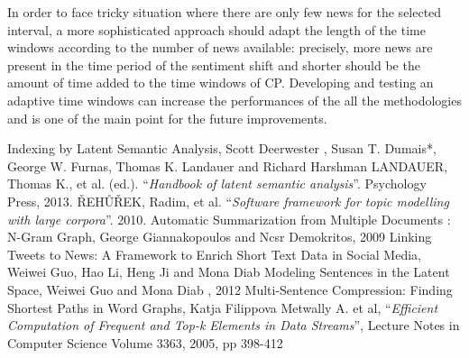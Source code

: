 \documentclass{acm_proc_article-sp-sigmod07}
\begin{document}
In order to face tricky situation where there are only few news for the selected interval, a more sophisticated approach should adapt the length of the time windows according to the number of news available:
precisely, more news are present in the time period of the sentiment shift and shorter should be the amount of time added to the time windows of CP.
Developing and testing an adaptive time windows can increase the performances of the all the methodologies and is one of the main point for the future improvements.

\begin{thebibliography}{9}
	Indexing by Latent Semantic Analysis, Scott Deerwester , Susan T. Dumais*, George W. Furnas,  Thomas K. Landauer  and Richard Harshman 
  LANDAUER, Thomas K., et al. (ed.). ``\emph{Handbook of latent semantic analysis}''. Psychology Press, 2013.
  ŘEHŮŘEK, Radim, et al. ``\emph{Software framework for topic modelling with large corpora}''. 2010.
	Automatic Summarization from Multiple Documents : N-Gram Graph, George Giannakopoulos and Ncsr Demokritos, 2009
	Linking Tweets to News: A Framework to Enrich Short Text Data in Social Media, Weiwei Guo, Hao Li, Heng Ji and Mona Diab
	Modeling Sentences in the Latent Space, Weiwei Guo and Mona Diab , 2012
	Multi-Sentence Compression: Finding Shortest Paths in Word Graphs, Katja Filippova 
	Metwally A. et al, ``\emph{Efficient Computation of Frequent and Top-k
	Elements in Data Streams}'', Lecture Notes in Computer Science Volume 3363, 2005, pp 398-412

\end{thebibliography}
\end{document}
